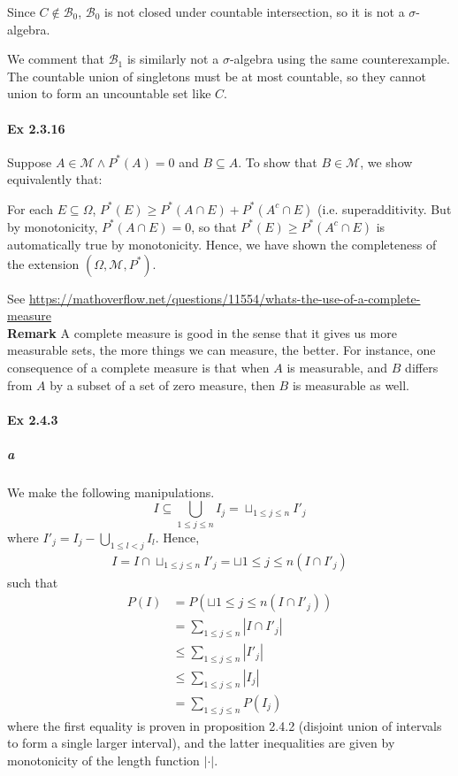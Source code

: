 \documentclass[a4paper]{article}
\begin{document}
Since $C\notin \mathcal{B}_0$, $\mathcal{B}_0$ is not closed under countable intersection, so it is not a $\sigma$-algebra.


We comment that $\mathcal{B}_1$ is similarly not a $\sigma$-algebra using the same counterexample. The countable union of singletons must be at most countable, so they cannot union to form an uncountable set like $C$.

\paragraph{Ex 2.3.16} Suppose $A\in \mathcal{M}\land P^*(A) = 0$ and $B\subseteq A$. To show that $B\in \mathcal{M}$, we show equivalently that:

For each $E\subseteq \Omega$, $P^*(E)\geq P^*(A\cap E) + P^*(A^c\cap E)$ (i.e. superadditivity. But by monotonicity, $P^*(A\cap E) = 0$, so that $P^*(E)\geq P^*(A^c\cap E)$ is automatically true by monotonicity. Hence, we have shown the completeness of the extension $(\Omega, \mathcal{M}, P^*)$.


See \url{https://mathoverflow.net/questions/11554/whats-the-use-of-a-complete-measure}\\
\textbf{Remark} A complete measure is good in the sense that it gives us more measurable sets, the more things we can measure, the better. For instance, one consequence of a complete measure is that when $A$ is measurable, and $B$ differs from $A$ by a subset of a set of zero measure, then $B$ is measurable as well.

\paragraph{Ex 2.4.3}
\subparagraph{a} We make the following manipulations.
\[
	I\subseteq \bigcup_{1\leq j\leq n}I_j = \sqcup_{1\leq j\leq n}I'_j
\]
where $I'_j = I_j - \bigcup_{1\leq l < j}I_l$. Hence,
\begin{align*}
	I = I\cap \sqcup_{1\leq j\leq n} I'_j = \sqcup{1\leq j\leq n} (I\cap I'_j)
\end{align*}
such that
\begin{align*}
	P(I) &= P(\sqcup{1\leq j\leq n} (I\cap I'_j))\\
	&=\sum_{1\leq j\leq n}|I\cap I'_j|\\
	&\leq \sum_{1\leq j\leq n} |I'_j|\\
	&\leq \sum_{1\leq j\leq n} |I_j|\\
	&=\sum_{1\leq j\leq n} P(I_j)
\end{align*}
where the first equality is proven in proposition 2.4.2 (disjoint union of intervals to form a single larger interval), and the latter inequalities are given by monotonicity of the length function $|\cdot|$.
\end{document}
